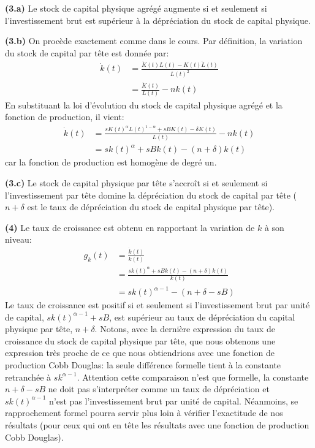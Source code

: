 \documentclass[10pt,a4paper,notitlepage]{article}
\newcommand{\question}[1]{\textbf{(#1)}}
\begin{document}
\question{3.a} Le stock de capital physique agrégé augmente si et
seulement si l'investissement brut est supérieur à la dépréciation du
stock de capital physique.\newline

\question{3.b} On procède exactement comme dans le cours. Par
définition, la variation du stock de capital par tête est donnée par:
\[
\begin{split}
  \dot k(t) &= \frac{\dot K(t)L(t)-K(t)\dot L(t)}{L(t)^2}\\
  &= \frac{\dot K(t)}{L(t)} - nk(t)
\end{split}
\]
En substituant la loi d'évolution du stock de capital physique agrégé
et la fonction de production, il vient:
\[
\begin{split}
  \dot k(t) &= \frac{sK(t)^\alpha L(t)^{1-\alpha} + sBK(t)-\delta K(t)}{L(t)} - nk(t)\\
  &= sk(t)^{\alpha} + sBk(t) - (n+\delta)k(t)
\end{split}
\]
car la fonction de production est homogène de degré un.\newline

\question{3.c} Le stock de capital physique par tête s'accroît si et
seulement si l'investissement par tête domine la dépréciation du stock
de capital par tête ($n+\delta$ est le taux de dépréciation du stock
de capital physique par tête).\newline


\question{4} Le taux de croissance est obtenu en rapportant la
variation de $k$ à son niveau:
\[
\begin{split}
  g_k(t) &= \frac{\dot k(t)}{k(t)}\\
  &= \frac{sk(t)^{\alpha} + sBk(t) - (n+\delta)k(t)}{k(t)}\\
  &= sk(t)^{\alpha-1} - (n+\delta-sB)
\end{split}
\]
Le taux de croissance est positif si et seulement si l'investissement
brut par unité de capital, $sk(t)^{\alpha-1}+sB$, est supérieur au
taux de dépréciation du capital physique par tête, $n+\delta$. Notons,
avec la dernière expression du taux de croissance du stock de capital
physique par tête, que nous obtenons une expression très proche de ce
que nous obtiendrions avec une fonction de production Cobb Douglas: la
seule différence formelle tient à la constante retranchée à
$sk^{\alpha-1}$. Attention cette comparaison n'est que formelle, la
constante $n+\delta-sB$ ne doit pas s'interpréter comme un taux de
dépréciation et $sk(t)^{\alpha-1}$ n'est pas l'investissement brut par
unité de capital. Néanmoins, se rapprochement formel pourra servir
plus loin à vérifier l'exactitude de nos résultats (pour ceux qui ont
en tête les résultats avec une fonction de production Cobb Douglas).\newline
\end{document}
